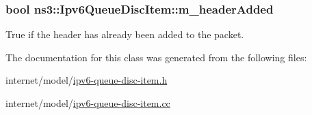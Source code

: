 \subsubsection[{\texorpdfstring{m\+\_\+header\+Added}{m_headerAdded}}]{\setlength{\rightskip}{0pt plus 5cm}bool ns3\+::\+Ipv6\+Queue\+Disc\+Item\+::m\+\_\+header\+Added\hspace{0.3cm}{\ttfamily [private]}}\hypertarget{classns3_1_1Ipv6QueueDiscItem_af8aab7d08fadc62cf1f251909a6422ce}{}\label{classns3_1_1Ipv6QueueDiscItem_af8aab7d08fadc62cf1f251909a6422ce}


True if the header has already been added to the packet. 



The documentation for this class was generated from the following files\+:\begin{DoxyCompactItemize}
\item 
internet/model/\hyperlink{ipv6-queue-disc-item_8h}{ipv6-\/queue-\/disc-\/item.\+h}\item 
internet/model/\hyperlink{ipv6-queue-disc-item_8cc}{ipv6-\/queue-\/disc-\/item.\+cc}\end{DoxyCompactItemize}
